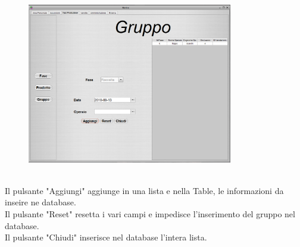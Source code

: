 \documentclass{article}
\begin{document}
\begin{itemize}
\begin{figure}[htbp]
\includegraphics[width=0.8\textwidth]{img/panel_group.png}
\end{figure}\\
Il pulsante "Aggiungi" aggiunge in una lista e nella Table, le informazioni da inseire ne database.\\
Il pulsante "Reset"  resetta i vari campi e impedisce l'inserimento del gruppo nel database.\\
Il pulsante "Chiudi" inserisce nel database l'intera lista.\\
\end{itemize}
\newpage
\end{document}
